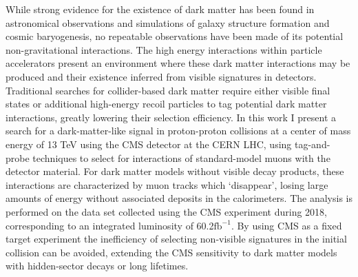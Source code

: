 While strong evidence for the existence of dark matter has been found in astronomical observations and simulations of galaxy structure formation and cosmic baryogenesis, no repeatable observations have been made of its potential non-gravitational interactions. 
The high energy interactions within particle accelerators present an environment where these dark matter interactions may be produced and their existence inferred from visible signatures in detectors. 
Traditional searches for collider-based dark matter require either visible final states or additional high-energy recoil particles to tag potential dark matter interactions, greatly lowering their selection efficiency. 
In this work I present a search for a dark-matter-like signal in proton-proton collisions at a center of mass energy of 13 TeV using the CMS detector at the CERN LHC, using tag-and-probe techniques to select for interactions of standard-model muons with the detector material.
For dark matter models without visible decay products, these interactions are characterized by muon tracks which `disappear', losing large amounts of energy without associated deposits in the calorimeters.
The analysis is performed on the data set collected using the CMS experiment during 2018, corresponding to an integrated luminosity of 60.2$\mathrm{fb}^{-1}$.
By using CMS as a fixed target experiment the inefficiency of selecting non-visible signatures in the initial collision can be avoided, extending the CMS sensitivity to dark matter models with hidden-sector decays or long lifetimes.

